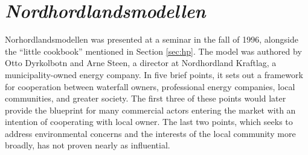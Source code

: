 
\section{{\it Nordhordlandsmodellen}}

Norhordlandsmodellen was presented at a seminar in the fall of 1996, alongside the ``little cookbook'' mentioned in Section \ref{sec:hp}. The model was authored by Otto Dyrkolbotn and  Arne Steen, a director at Nordhordland Kraftlag, a municipality-owned energy company. In five brief points, it sets out a framework for cooperation between waterfall owners, professional energy companies, local communities, and greater society. The first three of these points would later provide the blueprint for many commercial actors entering the market with an intention of cooperating with local owner. The last two points, which seeks to address environmental concerns and the interests of the local community more broadly, has not proven nearly as influential.

